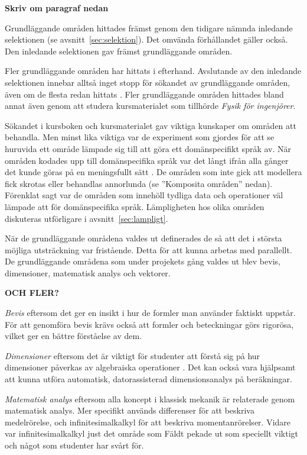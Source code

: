 \begin{binge}

\textbf{Skriv om paragraf nedan}

Grundläggande områden hittades främst genom den tidigare nämnda inledande
selektionen (se avsnitt~\ref{sec:selektion}). Det omvända förhållandet gäller
också. Den inledande selektionen gav främst grundläggande områden. 

Fler grundläggande områden har hittats i efterhand. Avslutande av den inledande
selektionen innebar alltså inget stopp för sökandet av grundläggande områden,
även om de flesta redan hittats . Fler grundläggande områden hittades bland annat även genom att
studera kursmaterialet som tillhörde \textit{Fysik för ingenjörer}.

Sökandet i kursboken och kursmaterialet gav viktiga kunskaper om områden att
behandla. Men minst lika viktiga var de experiment som gjordes för att se
huruvida ett område lämpade sig till att göra ett domänspecifikt språk av. När
områden kodades upp till domänspecifika språk var det långt ifrån alla gånger
det kunde göras på en meningsfullt sätt . De
områden som inte gick att modellera fick skrotas eller behandlas annorlunda
(se ''Komposita områden'' nedan). Förenklat sagt var de områden som
innehöll tydliga data och operationer väl lämpade att för domänspecifika
språk. Lämpligheten hos olika områden diskuteras utförligare i
avsnitt~\ref{sec:lampligt}.

När de grundläggande områdena valdes ut definerades de så att det i största möjliga
utsträckning var fristående. Detta för att kunna arbetas med parallellt. De
grundläggande områdena som under projekets gång valdes ut blev bevis,
dimensioner, matematisk analys och vektorer. 

\textbf{OCH FLER?}

\textit{Bevis} eftersom det ger en insikt i hur de formler man använder
faktiskt uppstår. För att genomföra bevis krävs också att formler och
beteckningar görs rigorösa, vilket ger en bättre förståelse av dem.

\textit{Dimensioner} eftersom det är viktigt för studenter att förstå sig på
hur dimensioner påverkas av algebraiska operationer . Det kan också vara hjälpsamt att kunna utföra automatisk,
datorassisterad dimensionsanalys på beräkningar.

\textit{Matematisk analys} eftersom alla koncept i klassisk mekanik är
relaterade genom matematisk analys. Mer specifikt används differenser för att
beskriva medelrörelse, och infinitesimalkalkyl för att beskriva
momentanrörelser. Vidare var infinitesimalkalkyl just det område som Fäldt
pekade ut som speciellt viktigt och något som studenter har svårt för.


\end{binge}
